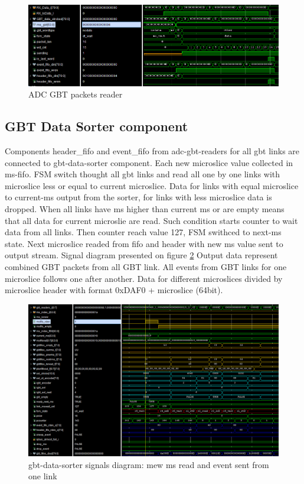 \documentclass{article}
\begin{document}
\begin{figure}[H]
	\centering 
	\includegraphics[width=1.0\textwidth]{ADC_GBT_reader_wave.png}
	\caption{\label{fig:11} ADC GBT packets reader}
\end{figure}

\subsection{GBT Data Sorter component}
Components header\_fifo and event\_fifo from adc-gbt-readers for all gbt links are connected to gbt-data-sorter component. Each new microslice value collected in ms-fifo. FSM switch thought all gbt links and read all one by one links with microslice less or equal to current microslice. Data for links with equal microslice to current-ms output from the sorter, for links with less microslice data is dropped. When all links have ms higher than current ms or are empty means that all data for current microslie are read. Such condition starts counter to wait data from all links. Then counter reach value 127, FSM swithced to next-ms state. Next microslice readed from fifo and header with new ms value sent to output stream. Signal diagram presented on figure \ref{fig:10} Output data represent combined GBT packets from all GBT link. All events from GBT links for one microslice follows one after another. Data for different microslices divided by microslice header with format 0xDAF0 + microslice (64bit). 


\begin{figure}[H]
	\centering 
	\includegraphics[width=1.0\textwidth]{gbt-sorter-waves.png}
	\caption{\label{fig:10} gbt-data-sorter signals diagram: mew ms read and event sent from one link }
\end{figure}
\end{document}
